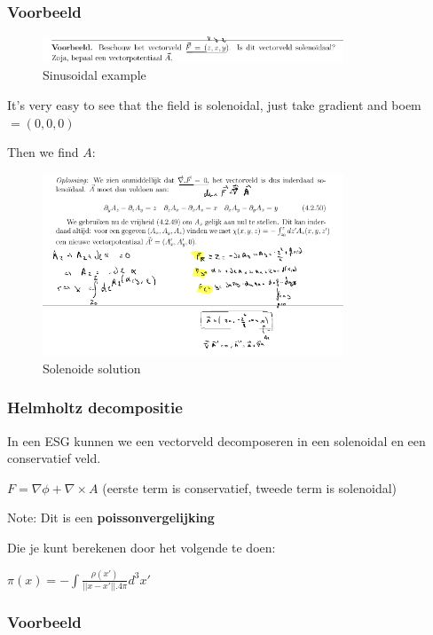 \documentclass[a4paper]{article}
\begin{document}
\subsubsection{Voorbeeld}


\begin{figure}[H]
	\centering
	\includegraphics[width=0.8\textwidth]{assets/sinusoidal_example.png}
	\caption{Sinusoidal example}
	\label{fig:sinusoidal_example}
\end{figure}

It's very easy to see that the field is solenoidal, just take gradient and boem $= (0,0,0)$

Then we find $A$:


\begin{figure}[H]
	\centering
	\includegraphics[width=0.8\textwidth]{assets/solenoide_solution.png}
	\caption{Solenoide solution}
	\label{fig:solenoide_solution}
\end{figure}

\subsubsection{Helmholtz decompositie}

In een ESG kunnen we een vectorveld decomposeren in een solenoidal en een conservatief veld.

$F = \nabla \phi + \nabla \times A$ (eerste term is conservatief, tweede term is solenoidal)

Note: Dit is een \textbf{poissonvergelijking}

Die je kunt berekenen door het volgende te doen:

$\pi(x) = - \int \frac{\rho(x')}{||x - x'|| . 4\pi} d^3 x'$

\subsubsection{Voorbeeld}
\end{document}

